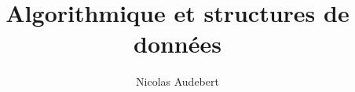 \documentclass{beamer}
\begin{document}
\title[Cours d'algorithmique]{Algorithmique et structures de données}
\author[nicolas.audebert@onera.fr]{Nicolas Audebert}
\setmainfont{Fira Sans}


\end{document}
